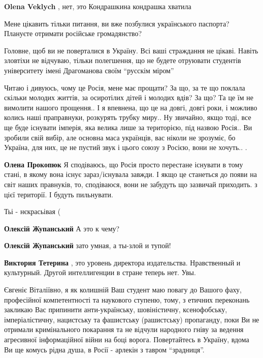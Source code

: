 \begin{itemize}
\begin{itemize}
\textbf{Olena Veklych} , нет, это Кондрашкина кондрашка хватила

\end{itemize} %


Мене цікавить тільки питання, ви вже позбулися українського паспорта? Плануєте
отримати російське громадянство?

Головне, щоб ви не поверталися в Україну. Всі ваші страждання не цікаві. Навіть
зловтіхи не відчуваю, тільки полегшення, що не будете отруювати студентів
університету імені Драгоманова своїм \enquote{русскім міром}



Читаю і дивуюсь, чому це Росія, мене має прощати? За що, за те що поклала
скільки молодих життів, за осиротілих дітей і молодих вдів? За що? Та це їм не
вимолити нашого прощення.. І я впевнена, що це на довгі, довгі роки, і можливо
колись наші праправнуки, розкурять трубку миру.. Ну звичайно, якщо тоді, все ще
буде існувати імперія, яка велика лише за територією, під назвою Росія.. Ви
зробили свій вибір, але основна маса українців, вас ніколи не зрозуміє, бо
Україна, для них, це не пустий звук і цього союзу з Росією, вони не хочуть..  .

\begin{itemize} %
\textbf{Олена Прокопюк} Я сподіваюсь, що Росія просто перестане існувати в тому стані, в якому вона існує зараз/існувала завжди. І якщо це станеться до появи на світ наших правнуків, то, сподіваюся, вони не забудуть що зазвичай приходить. з цієї території. І будуть пильнувати.
\end{itemize} %

Тьі - нєкрасьівая (

\begin{itemize} %
\textbf{Олексій Жупанський} А это к чему?

\textbf{Олексій Жупанський} зато умная, а ты-злой и тупой!

\textbf{Виктория Тетерина} , это уровень директора издательства. Нравственный и культурный. Другой интеллигенции в стране теперь нет. Увы.
\end{itemize} %


Євгеніє Віталіївно, я як колишній Ваш студент маю повагу до Вашого фаху,
професійної компетентності та наукового ступеню, тому, з етичних переконань
закликаю Вас припинити анти-українську, шовіністичну, ксенофобську,
імперіалістичну, нацистську та фашистську (рашистську) пропаганду, поки Ви не
отримали кримінального покарання та не відчули народного гніву за ведення
агресивної інформаційної війни на боці ворога. Повертайтесь в Україну, вдома Ви
ще комусь рідна душа, в Росії - арлекін з тавром \enquote{зрадниця}.


\end{itemize}
